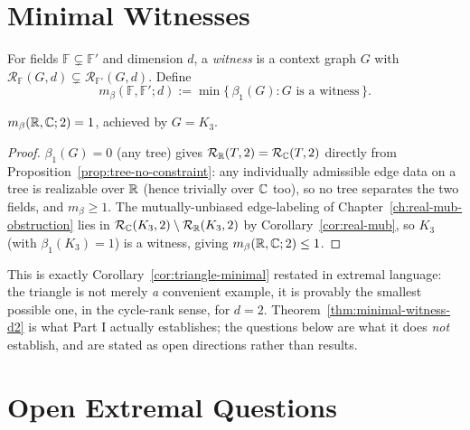 \section{Minimal Witnesses}

\begin{definition}
\label{def:minimal-witness}
For fields $\mathbb F \subsetneq \mathbb F'$ and dimension $d$, a
\emph{witness} is a context graph $G$ with $\mathcal R_{\mathbb F}(G,d)
\subsetneq \mathcal R_{\mathbb F'}(G,d)$. Define
\begin{equation}
m_\beta(\mathbb F,\mathbb F';d) := \min\{\, \beta_1(G) : G \text{ is a witness} \,\}.
\end{equation}
\end{definition}

\begin{theorem}[The $d=2$ real/complex minimal witness]
\label{thm:minimal-witness-d2}
$m_\beta(\mathbb{R},\mathbb{C};2) = 1$, achieved by $G=K_3$.
\end{theorem}

\begin{proof}
$\beta_1(G)=0$ (any tree) gives $\mathcal R_{\mathbb{R}}(T,2) = \mathcal R_{\mathbb{C}}(T,2)$
directly from Proposition~\ref{prop:tree-no-constraint}: any individually
admissible edge data on a tree is realizable over $\mathbb{R}$ (hence trivially over
$\mathbb{C}$ too), so no tree separates the two fields, and $m_\beta \ge 1$. The
mutually-unbiased edge-labeling of Chapter~\ref{ch:real-mub-obstruction} lies
in $\mathcal R_{\mathbb{C}}(K_3,2) \setminus \mathcal R_{\mathbb{R}}(K_3,2)$ by
Corollary~\ref{cor:real-mub}, so $K_3$ (with $\beta_1(K_3)=1$) is a witness,
giving $m_\beta(\mathbb{R},\mathbb{C};2) \le 1$.
\end{proof}

\begin{remark}
This is exactly Corollary~\ref{cor:triangle-minimal} restated in extremal
language: the triangle is not merely \emph{a} convenient example, it is
provably the smallest possible one, in the cycle-rank sense, for $d=2$.
Theorem~\ref{thm:minimal-witness-d2} is what Part I actually establishes; the
questions below are what it does \emph{not} establish, and are stated as open
directions rather than results.
\end{remark}

\section{Open Extremal Questions}
\label{sec:open-extremal}

